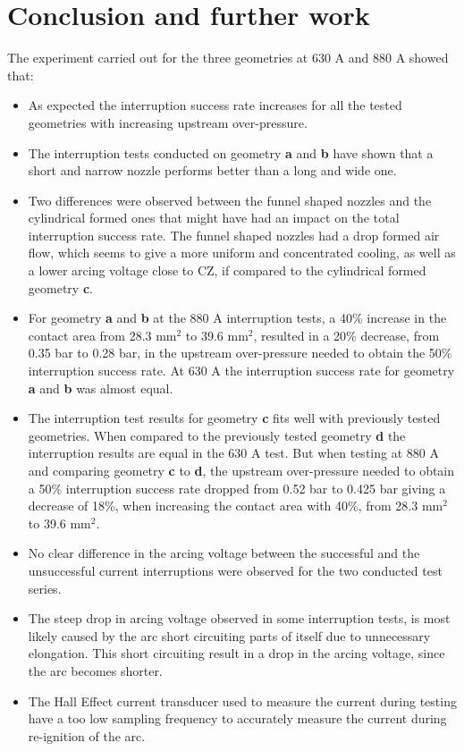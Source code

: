 \documentclass[10pt,b5paper,twoside]{article}
\begin{document}
\section{Conclusion and further work}
The experiment carried out for the three geometries at 630 A and 880 A showed that:
\begin{itemize}
\item As expected the interruption success rate increases for all the tested geometries with increasing upstream over-pressure. 

\item The interruption tests conducted on geometry \textbf{a} and \textbf{b} have shown that a short and narrow nozzle performs better than a long and wide one.

\item Two differences were observed between the funnel shaped nozzles and the cylindrical formed ones that might have had an impact on the total interruption success rate. The funnel shaped nozzles had a drop formed air flow, which seems to give a more uniform and concentrated cooling, as well as a lower arcing voltage close to CZ, if compared to the cylindrical formed geometry \textbf{c}.

\item For geometry \textbf{a} and \textbf{b} at the 880 A interruption tests, a 40\% increase in the contact area from 28.3 mm$^2$ to 39.6 mm$^2$, resulted in a 20\% decrease, from 0.35 bar to 0.28 bar, in the upstream over-pressure needed to obtain the 50\% interruption success rate. At 630 A the interruption success rate for geometry \textbf{a} and \textbf{b} was almost equal.

\item The interruption test results for geometry \textbf{c} fits well with previously tested geometries. When compared to the previously tested geometry \textbf{d} the interruption results are equal in the 630 A test. But when testing at 880 A and comparing geometry \textbf{c} to \textbf{d}, the upstream over-pressure needed to obtain a 50\% interruption success rate dropped from 0.52 bar to 0.425 bar giving a decrease of 18\%, when increasing the contact area with 40\%, from 28.3 mm$^2$ to 39.6 mm$^2$.

\item No clear difference in the arcing voltage between the successful and the unsuccessful current interruptions were observed for the two conducted test series.

\item The steep drop in arcing voltage observed in some interruption tests, is most likely caused by the arc short circuiting parts of itself due to unnecessary elongation. This short circuiting result in a drop in the arcing voltage, since the arc becomes shorter.

\item The Hall Effect current transducer used to measure the current during testing have a too low sampling frequency to accurately measure the current during re-ignition of the arc.
\end{itemize}
\end{document}
